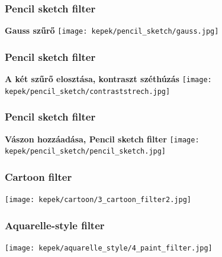 \documentclass{beamer}
\begin{document}
\begin{frame}[fragile]
\frametitle{Pencil sketch filter}
\begin{center}
\textbf{Gauss szűrő}
\texttt{[image: kepek/pencil\_sketch/gauss.jpg]}
\end{center}
\end{frame}

\begin{frame}[fragile]
\frametitle{Pencil sketch filter}
\begin{center}
\textbf{A két szűrő elosztása, kontraszt széthúzás}
\texttt{[image: kepek/pencil\_sketch/contraststrech.jpg]}
\end{center}
\end{frame}

\begin{frame}[fragile]
\frametitle{Pencil sketch filter}
\begin{center}
\textbf{Vászon hozzáadása, Pencil sketch filter}
\texttt{[image: kepek/pencil\_sketch/pencil\_sketch.jpg]}
\end{center}
\end{frame}

\begin{frame}[fragile]
\frametitle{Cartoon filter}
\begin{center}
\texttt{[image: kepek/cartoon/3\_cartoon\_filter2.jpg]}
\end{center}
\end{frame}


\begin{frame}[fragile]
\frametitle{Aquarelle-style filter}
\begin{center}
\texttt{[image: kepek/aquarelle\_style/4\_paint\_filter.jpg]}
\end{center}
\end{frame}
\end{document}
